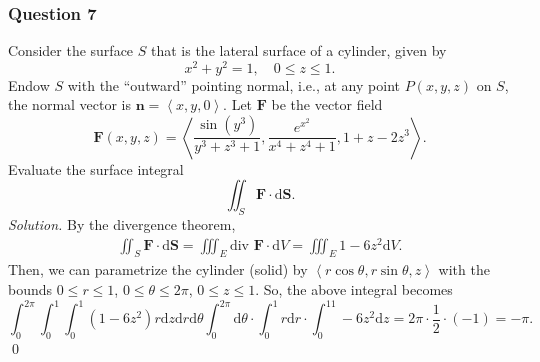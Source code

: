 \documentclass[12pt, twoside=false]{scrbook}
\newcommand{\vc}[1]{\textbf{{#1}}}
\newcommand{\pvc}[1]{\left\langle {#1} \right\rangle}
\newcounter{a}
\begin{document}
\subsubsection*{Question 7}
Consider the surface $S$ that is the lateral surface of a cylinder, given by 
    $$x^2+y^2=1, \quad 0\leq z\leq 1.$$
    Endow $S$ with the ``outward'' pointing normal, i.e., at any point $P(x, y, z)$ on $S$, the normal vector is $\vc{n}=\pvc{x, y, 0}$. Let $\vc{F}$ be the vector field
    $$\vc{F}(x, y, z)=\pvc{\frac{\sin(y^3)}{y^3+z^3+1}, \frac{e^{x^2}}{x^4+z^4+1}, 1+z-2z^3}.$$
    Evaluate the surface integral
    $$\iint_S\vc{F}\cdot\text{d}\vc{S}.$$
\textit{Solution.} By the divergence theorem, 
\begin{align*}
    \iint_S\vc{F}\cdot\text{d}\vc{S}= \iiint_E\text{div } \vc{F}\cdot\text{d}V= \iiint_E 1-6z^2\text{d}V.
\end{align*}
Then, we can parametrize the cylinder (solid) by $\pvc{r\cos\theta, r\sin\theta, z}$ with the bounds $0\leq r\leq 1$, $0\leq \theta\leq 2\pi$, $0\leq z\leq 1$. So, the above integral becomes 
\[\int_0^{2\pi}\int_0^1\int_0^1(1-6z^2)r\text{d}z\text{d}r\text{d}\theta \int_0^{2\pi}\text{d}\theta\cdot\int_0^1r\text{d}r\cdot\int_0^11-6z^2\text{d}z= 2\pi\cdot\frac{1}{2}\cdot(-1)= -\pi.\]
\qed 
\end{document}

